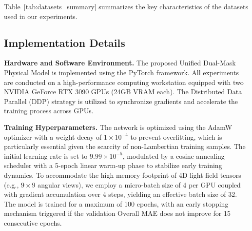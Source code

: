 \documentclass[lettersize,journal]{IEEEtran}
\begin{document}
Table~\ref{tab:datasets_summary} summarizes the key characteristics of the datasets used in our experiments.

\begin{table}[!t]
\caption{Summary of the Datasets Used for Training and Evaluation}\label{tab:datasets_summary}
\centering\small
{}
\end{table}

\subsection{Implementation Details}

\textbf{Hardware and Software Environment.} 
The proposed Unified Dual-Mask Physical Model is implemented using the PyTorch framework. All experiments are conducted on a high-performance computing workstation equipped with two NVIDIA GeForce RTX 3090 GPUs (24GB VRAM each). The Distributed Data Parallel (DDP) strategy is utilized to synchronize gradients and accelerate the training process across GPUs.

\textbf{Training Hyperparameters.} 
The network is optimized using the AdamW optimizer with a weight decay of $1 \times 10^{-4}$ to prevent overfitting, which is particularly essential given the scarcity of non-Lambertian training samples. The initial learning rate is set to $9.99 \times 10^{-5}$, modulated by a cosine annealing scheduler with a 5-epoch linear warm-up phase to stabilize early training dynamics. To accommodate the high memory footprint of 4D light field tensors (e.g., $9 \times 9$ angular views), we employ a micro-batch size of 4 per GPU coupled with gradient accumulation over 4 steps, yielding an effective batch size of 32. The model is trained for a maximum of 100 epochs, with an early stopping mechanism triggered if the validation Overall MAE does not improve for 15 consecutive epochs. 
\end{document}
